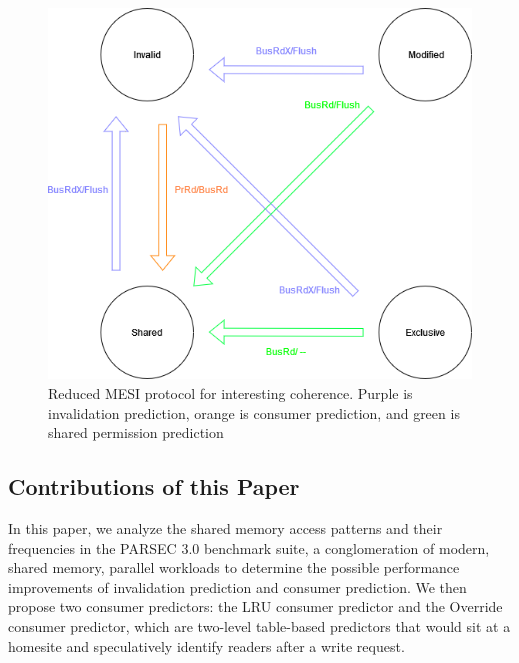     \begin{figure}
        \centering
        \includegraphics[scale=0.3]{img/reduced_interesting_mesi.drawio.png}
        \caption{Reduced MESI protocol for interesting coherence. Purple is invalidation prediction, orange is consumer prediction, and green is shared permission prediction}
        \label{fig:predictable-mesi}
    \end{figure}

\subsection{Contributions of this Paper}
    In this paper, we analyze the shared memory access patterns and their frequencies in the PARSEC 3.0 \cite{zhan_parsec3.0_2016} benchmark suite, a conglomeration of modern, shared memory, parallel workloads to determine the possible performance improvements of invalidation prediction and consumer prediction. We then propose two consumer predictors: the LRU consumer predictor and the Override consumer predictor, which are two-level table-based predictors that would sit at a homesite and speculatively identify readers after a write request.

